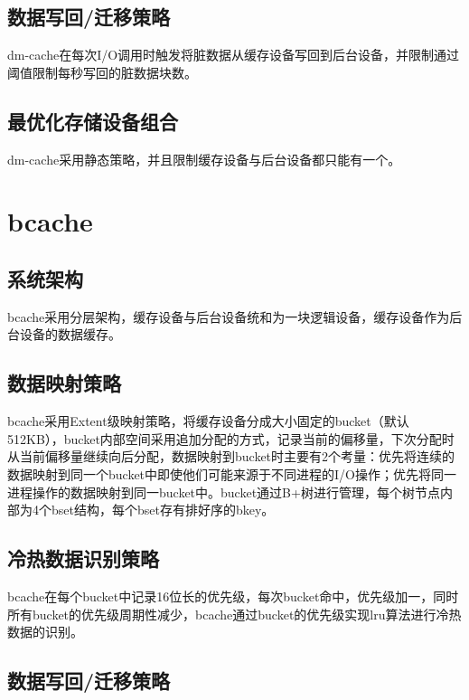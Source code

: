 \subsection{数据写回/迁移策略}

dm-cache在每次I/O调用时触发将脏数据从缓存设备写回到后台设备，并限制通过阈值限制每秒写回的脏数据块数。

\subsection{最优化存储设备组合}

dm-cache采用静态策略，并且限制缓存设备与后台设备都只能有一个。

\section{bcache}

\subsection{系统架构}

bcache采用分层架构，缓存设备与后台设备统和为一块逻辑设备，缓存设备作为后台设备的数据缓存。

\subsection{数据映射策略}

bcache采用Extent级映射策略，将缓存设备分成大小固定的bucket（默认512KB），bucket内部空间采用追加分配的方式，记录当前的偏移量，下次分配时从当前偏移量继续向后分配，数据映射到bucket时主要有2个考量：优先将连续的数据映射到同一个bucket中即使他们可能来源于不同进程的I/O操作；优先将同一进程操作的数据映射到同一bucket中。bucket通过B+树进行管理，每个树节点内部为4个bset结构，每个bset存有排好序的bkey。

\subsection{冷热数据识别策略}

bcache在每个bucket中记录16位长的优先级，每次bucket命中，优先级加一，同时所有bucket的优先级周期性减少，bcache通过bucket的优先级实现lru算法进行冷热数据的识别。

\subsection{数据写回/迁移策略}

